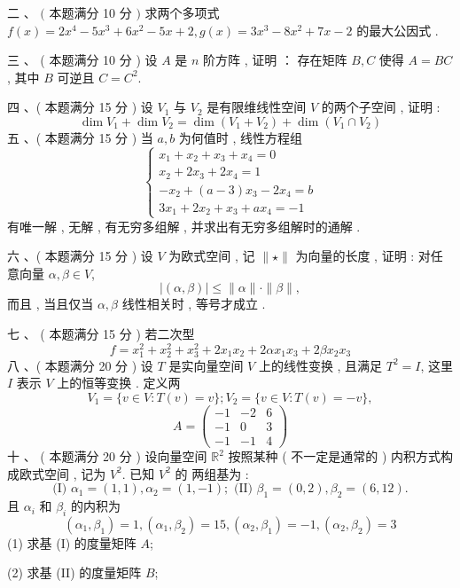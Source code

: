\documentclass[10pt]{article}
\begin{document}
{ 二 、 $($  本题满分  10  分  $)$  求两个多项式  $f(x)=2 x^{4}-5 x^{3}+6 x^{2}-5 x+2, g(x)=3 x^{3}-8 x^{2}+7 x-2$  的最大公因式 .

 三 、 ( 本题满分  10  分 )  设  $A$  是  $n$  阶方阵 ,  证明 ： 存在矩阵  $B, C$  使得  $A=B C$,  其中  $B$  可逆且  $C=C^{2}$.

 四 、( 本题满分  15  分 )  设  $V_{1}$  与  $V_{2}$  是有限维线性空间  $V$  的两个子空间 ,  证明 :
$$
\operatorname{dim} V_{1}+\operatorname{dim} V_{2}=\operatorname{dim}\left(V_{1}+V_{2}\right)+\operatorname{dim}\left(V_{1} \cap V_{2}\right)
$$
 五 、( 本题满分  15  分 )  当  $a, b$  为何值时 ,  线性方程组 
$$
\left\{\begin{array}{l}
x_{1}+x_{2}+x_{3}+x_{4}=0 \\
x_{2}+2 x_{3}+2 x_{4}=1 \\
-x_{2}+(a-3) x_{3}-2 x_{4}=b \\
3 x_{1}+2 x_{2}+x_{3}+a x_{4}=-1
\end{array}\right.
$$
 有唯一解 ,  无解 ,  有无穷多组解 ,  并求出有无穷多组解时的通解 .

 六 、( 本题满分  15  分 )  设  $V$  为欧式空间 ,  记  $\|\star\|$  为向量的长度 ,  证明 :  对任意向量  $\alpha, \beta \in V$,
$$
|(\alpha, \beta)| \leqslant\|\alpha\| \cdot\|\beta\|,
$$
 而且 ,  当且仅当  $\alpha, \beta$  线性相关时 ,  等号才成立 .

 七 、 ( 本题满分  15  分 )  若二次型 
$$
f=x_{1}^{2}+x_{2}^{2}+x_{3}^{2}+2 x_{1} x_{2}+2 \alpha x_{1} x_{3}+2 \beta x_{2} x_{3}
$$
 八 、( 本题满分  20  分 )  设  $T$  是实向量空间  $V$  上的线性变换 ,  且满足  $T^{2}=I$,  这里  $I$  表示  $V$  上的恒等变换 .  定义两 
$$
V_{1}=\{v \in V: T(v)=v\} ; V_{2}=\{v \in V: T(v)=-v\},
$$
$$
A=\left(\begin{array}{ccc}
-1 & -2 & 6 \\
-1 & 0 & 3 \\
-1 & -1 & 4
\end{array}\right)
$$
 十 、 ( 本题满分  20  分 )  设向量空间  $\mathbb{R}^{2}$  按照某种  ( 不一定是通常的 )  内积方式构成欧式空间 ,  记为  $V^{2}$.  已知  $V^{2}$  的   两组基为 :
$$
\text { (I) } \alpha_{1}=(1,1), \alpha_{2}=(1,-1) ; \text { (II) } \beta_{1}=(0,2), \beta_{2}=(6,12) \text {. }
$$
 且  $\alpha_{i}$  和  $\beta_{i}$  的内积为 
$$
\left(\alpha_{1}, \beta_{1}\right)=1,\left(\alpha_{1}, \beta_{2}\right)=15,\left(\alpha_{2}, \beta_{1}\right)=-1,\left(\alpha_{2}, \beta_{2}\right)=3
$$
(1)  求基  (I)  的度量矩阵  $A$;

(2)  求基  (II)  的度量矩阵  $B$;

}
\end{document}
